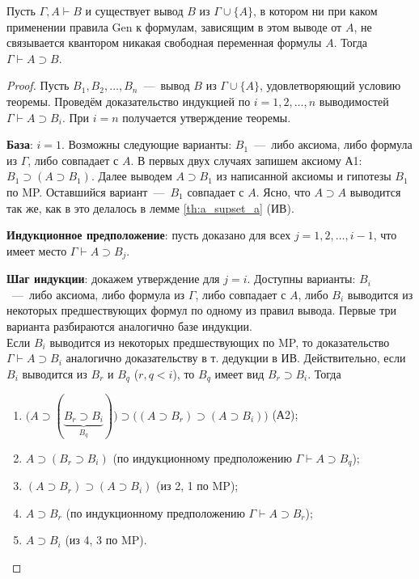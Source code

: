\begin{theorem}
    Пусть $\Gamma, A \vdash B$ и существует вывод $B$ из $\Gamma \cup \{A\}$, в котором ни при каком применении правила Gen к формулам, зависящим в этом выводе от $A$, не связывается квантором никакая свободная переменная формулы $A$. Тогда $\Gamma \vdash A \supset B$.
\end{theorem}
\begin{proof}
    Пусть $B_1, B_2, \dots, B_n$~---~вывод $B$ из $\Gamma \cup \{A\}$, удовлетворяющий условию теоремы. Проведём доказательство индукцией по $i = 1, 2, \dots, n$ выводимостей $\Gamma \vdash A \supset B_i$. При $i = n$ получается утверждение теоремы.

    \textbf{База}: $i = 1$. Возможны следующие варианты: $B_1$~---~либо аксиома, либо формула из $\Gamma$, либо совпадает с $A$. В первых двух случаях запишем аксиому А1: $B_1 \supset (A \supset B_1)$. Далее выводем $A \supset B_1$ из написанной аксиомы и гипотезы $B_1$ по MP. Оставшийся вариант~---~$B_1$ совпадает с $A$. Ясно, что $A \supset A$ выводится так же, как в это делалось в лемме \ref{th:a_supset_a} (ИВ).

    \textbf{Индукционное предположение}: пусть доказано для всех $j = 1, 2, \dots, i - 1$, что имеет место $\Gamma \vdash A \supset B_j$.

    \textbf{Шаг индукции}: докажем утверждение для $j = i$. Доступны варианты: $B_i$~---~либо аксиома, либо формула из $\Gamma$, либо совпадает с $A$, либо $B_i$ выводится из некоторых предшествующих формул по одному из правил вывода. Первые три варианта разбираются аналогично базе индукции. \\
    Если $B_i$ выводится из некоторых предшествующих по MP, то доказательство $\Gamma \vdash A \supset B_i$ аналогично доказательству в т. дедукции в ИВ. Действительно, если $B_i$ выводится из $B_r$ и $B_q$ ($r, q < i$), то $B_q$ имеет вид $B_r \supset B_i$. Тогда 
    \begin{enumerate}
        \item $\big(A \supset (\underbrace{B_r \supset B_i}_{B_q})\big) \supset \big((A \supset B_r) \supset (A \supset B_i)\big)$ (А2);
        \item $A \supset (B_r \supset B_i)$ (по индукционному предположению $\Gamma \vdash A \supset B_q$);
        \item $(A \supset B_r) \supset (A \supset B_i)$ (из 2, 1 по MP);
        \item $A \supset B_r$ (по индукционному предположению $\Gamma \vdash A \supset B_r$);
        \item $A \supset B_i$ (из 4, 3 по MP).
    \end{enumerate}


\end{proof}
